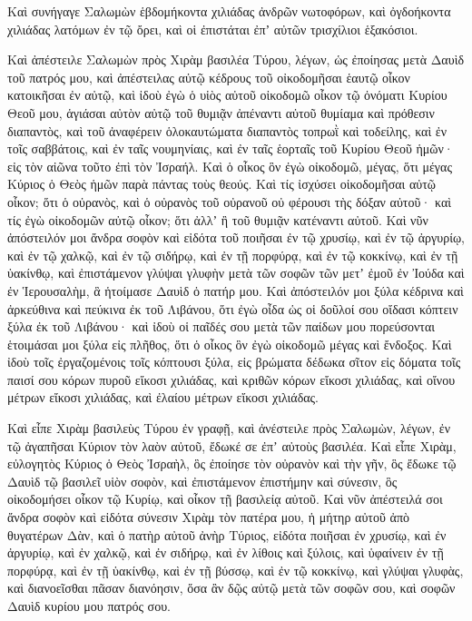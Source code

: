 {Καὶ συνήγαγε Σαλωμὼν ἑβδομήκοντα χιλιάδας ἀνδρῶν νωτοφόρων, καὶ ὀγδοήκοντα χιλιάδας λατόμων ἐν τῷ ὄρει, καὶ οἱ ἐπιστάται ἐπʼ αὐτῶν τρισχίλιοι ἑξακόσιοι.
\par }{\PP {}Καὶ ἀπέστειλε Σαλωμὼν πρὸς Χιρὰμ βασιλέα Τύρου, λέγων, ὡς ἐποίησας μετὰ Δαυὶδ τοῦ πατρός μου, καὶ ἀπέστειλας αὐτῷ κέδρους τοῦ οἰκοδομῆσαι ἑαυτῷ οἶκον κατοικῆσαι ἐν αὐτῷ,
καὶ ἰδοὺ ἐγὼ ὁ υἱὸς αὐτοῦ οἰκοδομῶ οἶκον τῷ ὀνόματι Κυρίου Θεοῦ μου, ἁγιάσαι αὐτὸν αὐτῷ τοῦ θυμιᾷν ἀπέναντι αὐτοῦ θυμίαμα καὶ πρόθεσιν διαπαντὸς, καὶ τοῦ ἀναφέρειν ὁλοκαυτώματα διαπαντὸς τοπρωῒ καὶ τοδείλης, καὶ ἐν τοῖς σαββάτοις, καὶ ἐν ταῖς νουμηνίαις, καὶ ἐν ταῖς ἑορταῖς τοῦ Κυρίου Θεοῦ ἡμῶν· εἰς τὸν αἰῶνα τοῦτο ἐπὶ τὸν Ἰσραήλ.
Καὶ ὁ οἶκος ὃν ἐγὼ οἰκοδομῶ, μέγας, ὅτι μέγας Κύριος ὁ Θεὸς ἡμῶν παρὰ πάντας τοὺς θεούς.
Καὶ τίς ἰσχύσει οἰκοδομῆσαι αὐτῷ οἶκον; ὅτι ὁ οὐρανὸς, καὶ ὁ οὐρανὸς τοῦ οὐρανοῦ οὐ φέρουσι τὴς δόξαν αὐτοῦ· καὶ τίς ἐγὼ οἰκοδομῶν αὐτῷ οἶκον; ὅτι ἀλλʼ ἢ τοῦ θυμιᾷν κατέναντι αὐτοῦ.
Καὶ νῦν ἀπόστειλόν μοι ἄνδρα σοφὸν καὶ εἰδότα τοῦ ποιῆσαι ἐν τῷ χρυσίῳ, καὶ ἐν τῷ ἀργυρίῳ, καὶ ἐν τῷ χαλκῷ, καὶ ἐν τῷ σιδήρῳ, καὶ ἐν τῇ πορφύρᾳ, καὶ ἐν τῷ κοκκίνῳ, καὶ ἐν τῇ ὑακίνθῳ, καὶ ἐπιστάμενον γλύψαι γλυφὴν μετὰ τῶν σοφῶν τῶν μετʼ ἐμοῦ ἐν Ἰούδα καὶ ἐν Ἱερουσαλὴμ, ἃ ἡτοίμασε Δαυὶδ ὁ πατήρ μου.
Καὶ ἀπόστειλόν μοι ξύλα κέδρινα καὶ ἀρκεύθινα καὶ πεύκινα ἐκ τοῦ Λιβάνου, ὅτι ἐγὼ οἶδα ὡς οἱ δοῦλοί σου οἴδασι κόπτειν ξύλα ἐκ τοῦ Λιβάνου· καὶ ἰδοὺ οἱ παῖδές σου μετὰ τῶν παίδων μου
πορεύσονται ἑτοιμάσαι μοι ξύλα εἰς πλῆθος, ὅτι ὁ οἶκος ὃν ἐγὼ οἰκοδομῶ μέγας καὶ ἔνδοξος.
Καὶ ἰδοὺ τοῖς ἐργαζομένοις τοῖς κόπτουσι ξύλα, εἰς βρώματα δέδωκα σῖτον εἰς δόματα τοῖς παισί σου κόρων πυροῦ εἴκοσι χιλιάδας, καὶ κριθῶν κόρων εἴκοσι χιλιάδας, καὶ οἴνου μέτρων εἴκοσι χιλιάδας, καὶ ἐλαίου μέτρων εἴκοσι χιλιάδας.
\par }{\PP {}Καὶ εἶπε Χιρὰμ βασιλεὺς Τύρου ἐν γραφῇ, καὶ ἀνέστειλε πρὸς Σαλωμὼν, λέγων, ἐν τῷ ἀγαπῆσαι Κύριον τὸν λαὸν αὐτοῦ, ἔδωκέ σε ἐπʼ αὐτοὺς βασιλέα.
Καὶ εἶπε Χιρὰμ, εὐλογητὸς Κύριος ὁ Θεὸς Ἰσραὴλ, ὃς ἐποίησε τὸν οὐρανὸν καὶ τὴν γῆν, ὃς ἔδωκε τῷ Δαυὶδ τῷ βασιλεῖ υἱὸν σοφὸν, καὶ ἐπιστάμενον ἐπιστήμην καὶ σύνεσιν, ὃς οἰκοδομήσει οἶκον τῷ Κυρίῳ, καὶ οἶκον τῇ βασιλείᾳ αὐτοῦ.
Καὶ νῦν ἀπέστειλά σοι ἄνδρα σοφὸν καὶ εἰδότα σύνεσιν Χιρὰμ τὸν πατέρα μου,
ἡ μήτηρ αὐτοῦ ἀπὸ θυγατέρων Δὰν, καὶ ὁ πατὴρ αὐτοῦ ἀνὴρ Τύριος, εἰδότα ποιῆσαι ἐν χρυσίῳ, καὶ ἐν ἀργυρίῳ, καὶ ἐν χαλκῷ, καὶ ἐν σιδήρῳ, καὶ ἐν λίθοις καὶ ξύλοις, καὶ ὑφαίνειν ἐν τῇ πορφύρᾳ, καὶ ἐν τῇ ὑακίνθῳ, καὶ ἐν τῇ βύσσῳ, καὶ ἐν τῷ κοκκίνῳ, καὶ γλύψαι γλυφὰς, καὶ διανοεῖσθαι πᾶσαν διανόησιν, ὅσα ἂν δῷς αὐτῷ μετὰ τῶν σοφῶν σου, καὶ σοφῶν Δαυὶδ κυρίου μου πατρός σου.
}

